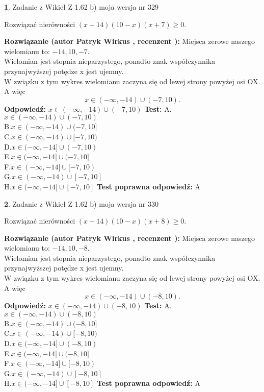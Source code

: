 \documentclass[12pt, a4paper]{article}
\theoremstyle{definition} %
\newtheorem{zad}{}
\newcommand{\zadStart}[1]{\begin{zad}#1\newline}
\newcommand{\zadStop}{\end{zad}}
\newcommand{\rozwStart}[2]{\noindent \textbf{Rozwiązanie (autor #1 , recenzent #2): }\newline}
\newcommand{\rozwStop}{\newline}
\newcommand{\odpStart}{\noindent \textbf{Odpowiedź:}\newline}
\newcommand{\odpStop}{\newline}
\newcommand{\testStart}{\noindent \textbf{Test:}\newline}
\newcommand{\testStop}{\newline}
\newcommand{\kluczStart}{\noindent \textbf{Test poprawna odpowiedź:}\newline}
\newcommand{\kluczStop}{\newline}
\begin{document}
\zadStart{Zadanie z Wikieł Z 1.62 b) moja wersja nr 329}

Rozwiązać nierówności $(x+14)(10-x)(x+7)\ge0$.
\zadStop
\rozwStart{Patryk Wirkus}{}
Miejsca zerowe naszego wielomianu to: $-14, 10, -7$.\\
Wielomian jest stopnia nieparzystego, ponadto znak współczynnika przy\linebreak najwyższej potędze x jest ujemny.\\ W związku z tym wykres wielomianu zaczyna się od lewej strony powyżej osi OX. A więc $$x \in (-\infty,-14) \cup (-7,10).$$
\rozwStop
\odpStart
$x \in (-\infty,-14) \cup (-7,10)$
\odpStop
\testStart
A.$x \in (-\infty,-14) \cup (-7,10)$\\
B.$x \in (-\infty,-14) \cup (-7,10]$\\
C.$x \in (-\infty,-14) \cup [-7,10)$\\
D.$x \in (-\infty,-14] \cup (-7,10)$\\
E.$x \in (-\infty,-14] \cup (-7,10]$\\
F.$x \in (-\infty,-14] \cup [-7,10)$\\
G.$x \in (-\infty,-14) \cup [-7,10]$\\
H.$x \in (-\infty,-14] \cup [-7,10]$
\testStop
\kluczStart
A
\kluczStop



\zadStart{Zadanie z Wikieł Z 1.62 b) moja wersja nr 330}

Rozwiązać nierówności $(x+14)(10-x)(x+8)\ge0$.
\zadStop
\rozwStart{Patryk Wirkus}{}
Miejsca zerowe naszego wielomianu to: $-14, 10, -8$.\\
Wielomian jest stopnia nieparzystego, ponadto znak współczynnika przy\linebreak najwyższej potędze x jest ujemny.\\ W związku z tym wykres wielomianu zaczyna się od lewej strony powyżej osi OX. A więc $$x \in (-\infty,-14) \cup (-8,10).$$
\rozwStop
\odpStart
$x \in (-\infty,-14) \cup (-8,10)$
\odpStop
\testStart
A.$x \in (-\infty,-14) \cup (-8,10)$\\
B.$x \in (-\infty,-14) \cup (-8,10]$\\
C.$x \in (-\infty,-14) \cup [-8,10)$\\
D.$x \in (-\infty,-14] \cup (-8,10)$\\
E.$x \in (-\infty,-14] \cup (-8,10]$\\
F.$x \in (-\infty,-14] \cup [-8,10)$\\
G.$x \in (-\infty,-14) \cup [-8,10]$\\
H.$x \in (-\infty,-14] \cup [-8,10]$
\testStop
\kluczStart
A
\kluczStop
\end{document}
